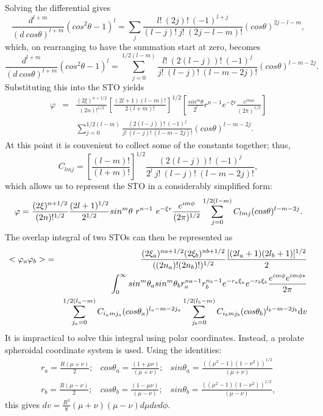 Solving the differential gives
$$
\frac{d^{l+m}}{(d\ cos\theta)^{l+m}}(cos^2\theta-1)^l = \sum_j\frac{l!\ (2j)!\ (-1)^{l+j}}{(l-j)!\ j!\ (2j-l-m)!}(cos\theta )^{2j-l-m},
$$
which, on rearranging to have the summation start at zero,
becomes
$$
\frac{d^{l+m}}{(d\ cos\theta)^{l+m}}(cos^2\theta-1)^l = \sum_{j=0}^{1/2(l-m)}\frac{l!\ (2(l-j))!\ (-1)^j}{j!\ (l-j)!\ (l-m-2j)!}(cos\theta )^{l-m-2j}.
$$
Substituting this into the STO yields
\begin{eqnarray}
\varphi &=& \frac{(2\xi )^{n+1/2}}{(2n)!^{1/2}}\left [\frac{(2l+1)(l-m)!}{2(l+m)!}\right ]^{1/2}\left [\frac{sin^m\theta }{2^l}r^{n-1}e^{-\xi r}\frac{e^{im\phi}}{(2\pi )^{1/2}}\right ] \nonumber \\
&& \sum_{j=0}^{1/2(l-m)}\frac{(2(l-j))!\ (-1)^j}{j!\ (l-j)!\ (l-m-2j)!}(cos\theta )^{l-m-2j}. \nonumber
\end{eqnarray}  
At this point it is convenient to collect some of the
constants together; thus,
$$
C_{lmj}=\left [\frac{(l-m)!}{(l+m)!}\right ]^{1/2}\frac{(2(l-j))!\ (-1)^j}{2^l\ j!\ (l-j)!\ (l-m-2j)!},
$$
which allows us to represent the STO in a considerably
simplified form:
$$
\varphi = \frac{(2\xi )^{n+1/2}}{(2n)!^{1/2}}\frac{(2l+1)^{1/2}}{2^{1/2}}sin^m\theta\ 
\/ r^{n-1}\ e^{-\xi r}\frac{e^{im\phi}}{(2\pi )^{1/2}}\sum_{j=0}^{1/2(l-m)}C_{lmj}(cos\theta)^{l-m-2j}.
$$
The overlap integral of two STOs can then be represented as
\begin{eqnarray}
<\varphi _a\varphi _b>& =& \frac{(2\xi _a)^{na+1/2}(2\xi _b)^{nb+1/2}}{((2n_a)!(2n_b)!)^{1/2}}
\frac{[(2l_a+1)(2l_b+1)]^{1/2}}{2}\nonumber \\ &&
\int _0^{\infty}sin^m\theta _a\/sin^m\theta _b\/r_a^{na-1}\/r_b^{n_b-1}e^{-r_a\xi _a}\/e^{-r_b\xi _b}\/
\frac{e^{im\phi}e^{im\phi *}}{2\pi } \nonumber \\
 & & \sum_{j_a=0}^{1/2(l_a-m)}C_{i_amj_a}(cos\theta_a)^{l_a-m-2j_a}
  \sum_{j_b=0}^{1/2(l_b-m)}C_{i_bmj_b}(cos\theta_b)^{l_b-m-2j_b}{\rm d}v\nonumber
\end{eqnarray}
It is impractical to solve this integral using polar
coordinates. Instead, a prolate spheroidal coordinate
system is used. Using the identities:
$$
\begin{array}{ccc}
r_a=\frac{R(\mu + \nu)}{2};  & cos\theta _a = \frac{(1+\mu \nu )}{(\mu + \nu )};&sin\theta _a = \frac{((\mu ^2-1)(1-\nu ^2))^{1/2}}{(\mu + \nu )} \\
 r_b=\frac{R(\mu - \nu)}{2}; &cos\theta _b = \frac{(1-\mu \nu )}{(\mu - \nu )};&
sin\theta _b = \frac{((\mu ^2-1)(1-\nu ^2))^{1/2}}{(\mu - \nu )},
\end{array}
$$
this gives
$
dv = \frac{R^3}{8}(\mu + \nu )(\mu - \nu)d\mu d\nu d\phi.
$

